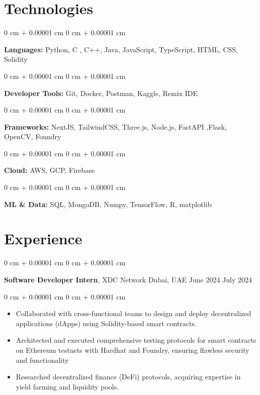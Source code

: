 \documentclass[10pt, letterpaper]{article}
\newenvironment{highlights}{
    \begin{itemize}[
        topsep=0.10 cm,
        parsep=0.10 cm,
        partopsep=0pt,
        itemsep=0pt,
        leftmargin=0 cm + 10pt
    ]
}{
    \end{itemize}
}
\newenvironment{onecolentry}{
    \begin{adjustwidth}{
        0 cm + 0.00001 cm
    }{
        0 cm + 0.00001 cm
    }
}{
    \end{adjustwidth}
}
\newenvironment{twocolentry}[2][]{
    \onecolentry
    \def\secondColumn{#2}
    \setcolumnwidth{\fill, 4.5 cm}
    \begin{paracol}{2}
}{
    \switchcolumn \raggedleft \secondColumn
    \end{paracol}
    \endonecolentry
}
\begin{document}
    \section{Technologies}

        \begin{onecolentry}
            \textbf{Languages:} Python, C , C++, Java, JavaScript, TypeScript, HTML, CSS, Solidity \end{onecolentry}

        \begin{onecolentry}
            \textbf{Developer Tools:} Git, Docker, Postman, Kaggle, Remix IDE \end{onecolentry}
        
        \begin{onecolentry}
            \textbf{Frameworks:} NextJS, TailwindCSS, Three.js, Node.js, FastAPI ,Flask, OpenCV, Foundry  
        \end{onecolentry}

        \begin{onecolentry}
            \textbf{Cloud:} AWS, GCP, Firebase \end{onecolentry}
        
        \begin{onecolentry}
            \textbf{ML \& Data:} SQL, MongoDB, Numpy, TensorFlow, R, matplotlib \end{onecolentry}

    \section{Experience}

        \begin{twocolentry}{
            June 2024 \textendash July 2024 
        }
            \textbf{Software Developer Intern}, XDC Network  \textendash  Dubai, UAE\end{twocolentry}

        \vspace{0.10 cm}
        \begin{onecolentry}
            \begin{highlights}
                \item Collaborated with cross-functional teams to design and deploy decentralized applications (dApps) using Solidity-based smart contracts. 
                \item Architected and executed comprehensive testing protocols for smart contracts on Ethereum testnets with Hardhat and Foundry, ensuring flawless security and functionality 
                \item Researched decentralized finance (DeFi) protocols, acquiring expertise in yield farming and liquidity pools. 

            \end{highlights}
        \end{onecolentry}
\end{document}
